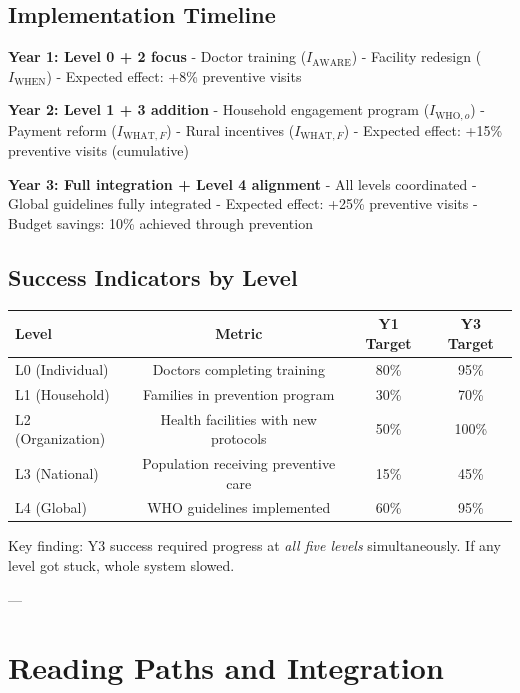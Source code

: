 \subsection{Implementation Timeline}

\textbf{Year 1: Level 0 + 2 focus}
- Doctor training ($I_{\text{AWARE}}$)
- Facility redesign ($I_{\text{WHEN}}$)
- Expected effect: +8\% preventive visits

\textbf{Year 2: Level 1 + 3 addition}
- Household engagement program ($I_{\text{WHO},o}$)
- Payment reform ($I_{\text{WHAT},F}$)
- Rural incentives ($I_{\text{WHAT},F}$)
- Expected effect: +15\% preventive visits (cumulative)

\textbf{Year 3: Full integration + Level 4 alignment}
- All levels coordinated
- Global guidelines fully integrated
- Expected effect: +25\% preventive visits
- Budget savings: 10\% achieved through prevention

\subsection{Success Indicators by Level}

\begin{center}
\small
\begin{tabular}{@{}lccc@{}}
\toprule
\textbf{Level} & \textbf{Metric} & \textbf{Y1 Target} & \textbf{Y3 Target} \\
\midrule
L0 (Individual) & Doctors completing training & 80\% & 95\% \\
L1 (Household) & Families in prevention program & 30\% & 70\% \\
L2 (Organization) & Health facilities with new protocols & 50\% & 100\% \\
L3 (National) & Population receiving preventive care & 15\% & 45\% \\
L4 (Global) & WHO guidelines implemented & 60\% & 95\% \\
\midrule
\end{tabular}
\end{center}

Key finding: Y3 success required progress at \emph{all five levels} simultaneously. If any level got stuck, whole system slowed.

---


\section*{Reading Paths and Integration}

